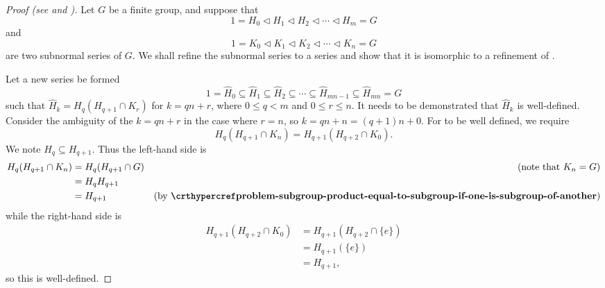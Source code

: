\begin{proof}[Proof (see {\cite[\S 72]{clark_1984}} and \cite{proofwiki_schreier-zassenhaus})]
    Let $G$ be a finite group, and suppose that
    \begin{equation}\label{eqn:thrm-schreier-eqn-a}
        1 = H_0 \lhd H_1 \lhd H_2 \lhd \cdots \lhd H_m = G    
        \tag{A}
    \end{equation}
    and
    \begin{equation}\label{eqn:thrm-schreier-eqn-b}
        1 = K_0 \lhd K_1 \lhd K_2 \lhd \cdots \lhd K_n = G    
        \tag{B}
    \end{equation}
    are two subnormal series of $G$. We shall refine the subnormal series  to a series  and show that it is isomorphic to a refinement  of .
    
    Let a new series be formed
    \begin{equation}\label{eqn:thrm-schreier-eqn-a-prime}
        1 = \hat{H}_0 \subseteq \hat{H}_1 \subseteq \hat{H}_2 \subseteq \cdots \subseteq \hat{H}_{mn - 1} \subseteq \hat{H}_{mn} = G
        \tag{A'}
    \end{equation}
    such that $\hat{H}_k = H_q(H_{q+1}\cap K_r)$ for $k = qn + r$, where $0 \leq q < m$ and $0 \leq r \leq n$. It needs to be demonstrated that $\hat{H}_k$ is well-defined. Consider the ambiguity of the $k = qn + r$ in the case where $r = n$, so $k = qn + n = (q+1)n + 0$. For  to be well defined, we require
    \[
        H_q(H_{q+1} \cap K_n) = H_{q+1}(H_{q+2} \cap K_0).
    \]
    We note $H_q \subseteq H_{q+1}$. Thus the left-hand side is
    \begin{align*}
        H_q(H_{q+1} \cap K_n) &= H_q(H_{q+1} \cap G) & (\text{note that } K_n = G)\\
        &= H_qH_{q+1}\\
        &= H_{q+1} & (\text{by \myref{problem-subgroup-product-equal-to-subgroup-if-one-is-subgroup-of-another}})
    \end{align*}
    while the right-hand side is
    \begin{align*}
        H_{q+1}(H_{q+2} \cap K_0) &= H_{q+1}(H_{q+2} \cap \{e\})\\
        &= H_{q+1}(\{e\})\\
        &= H_{q+1},
    \end{align*}
    so this is well-defined.
    

\end{proof}
